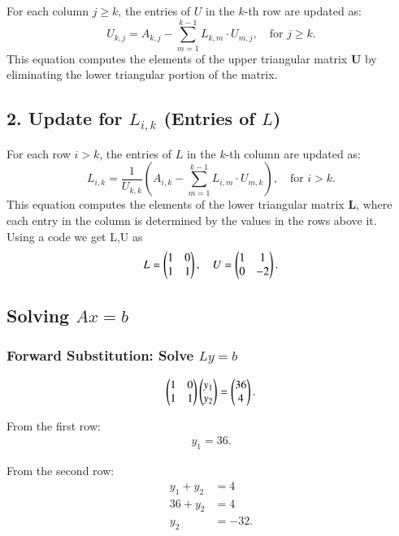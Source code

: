 \documentclass[journal,12pt,onecolumn]{IEEEtran}
\theoremstyle{remark}
\begin{document}
For each column $ j \geq k $, the entries of $ U $ in the $ k $-th row are updated as:
\[
U_{k,j} = A_{k,j} - \sum_{m=1}^{k-1} L_{k,m} \cdot U_{m,j}, \quad \text{for } j \geq k.
\]
This equation computes the elements of the upper triangular matrix $ \mathbf{U} $ by eliminating the lower triangular portion of the matrix.

\subsection*{2. Update for $ L_{i,k} $ (Entries of $ L $)}

For each row $ i > k $, the entries of $ L $ in the $ k $-th column are updated as:
\[
L_{i,k} = \frac{1}{U_{k,k}} \left( A_{i,k} - \sum_{m=1}^{k-1} L_{i,m} \cdot U_{m,k} \right), \quad \text{for } i > k.
\]
This equation computes the elements of the lower triangular matrix $ \mathbf{L} $, where each entry in the column is determined by the values in the rows above it.\\
Using a code we get L,U as 
\begin{align}
L = \begin{pmatrix}1 & 0 \\ 1 & 1\end{pmatrix}, \quad
U = \begin{pmatrix}1 & 1 \\ 0 & -2\end{pmatrix}.
\end{align}

\subsection*{Solving $A{x} = {b}$}

\subsubsection*{Forward Substitution: Solve $Ly = b$}
\begin{align}
\begin{pmatrix}1 & 0 \\ 1 & 1\end{pmatrix}
\begin{pmatrix}y_1 \\ y_2\end{pmatrix}
=
\begin{pmatrix}36 \\ 4\end{pmatrix}.
\end{align}

From the first row:
\begin{align}
y_1 = 36.
\end{align}

From the second row:
\begin{align}
y_1 + y_2 &= 4 \\
36 + y_2 &= 4 \\
y_2 &= -32.
\end{align}
\end{document}
